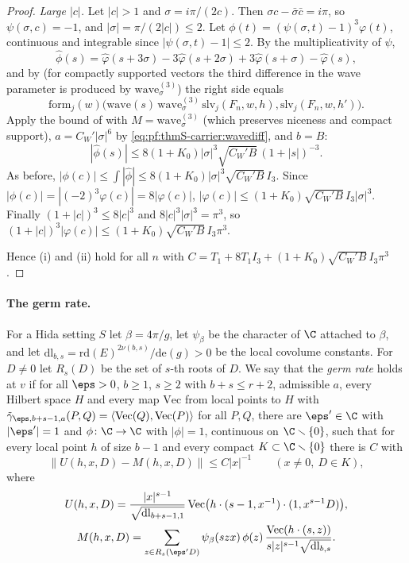 \begin{proof}
\emph{Large $|c|$.} Let $|c|>1$ and $\sigma=i\pi/(2c)$. Then $\sigma c-\bar\sigma\bar c=i\pi$, so $\psi(\sigma,c)=-1$, and
$|\sigma|=\pi/(2|c|)\le2$. Let $\phi(t)=(\psi(\sigma,t)-1)^3\varphi(t)$, continuous and integrable since $|\psi(\sigma,t)-1|\le2$.
By the multiplicativity of $\psi$,
\[
\hat\phi(s)=\hat\varphi(s+3\sigma)-3\hat\varphi(s+2\sigma)+3\hat\varphi(s+\sigma)-\hat\varphi(s),
\]
and by  (for compactly supported vectors the third difference in
the wave parameter is produced by $\mathrm{wave}^{(3)}_\sigma$) the right side equals
\[
\mathrm{form}_j(w)\bigl(\mathrm{wave}(s)\,\mathrm{wave}^{(3)}_\sigma\,\mathrm{slv}_j(F_n,w,h),\mathrm{slv}_j(F_n,w,h')\bigr).
\]
Apply the bound of  with $M=\mathrm{wave}^{(3)}_\sigma$ (which preserves niceness and
compact support), $a=C_W'|\sigma|^6$ by \eqref{eq:pf:thmS-carrier:wavediff}, and $b=B$:
\[
|\hat\phi(s)|\le8(1+K_0)|\sigma|^3\sqrt{C_W'B}\,(1+|s|)^{-3}.
\]
As before, $|\phi(c)|\le\int|\hat\phi|\le8(1+K_0)|\sigma|^3\sqrt{C_W'B}\,I_3$. Since $|\phi(c)|=|(-2)^3\varphi(c)|=8|\varphi(c)|$,
$|\varphi(c)|\le(1+K_0)\sqrt{C_W'B}\,I_3|\sigma|^3$. Finally $(1+|c|)^3\le8|c|^3$ and $8|c|^3|\sigma|^3=\pi^3$, so
$(1+|c|)^3|\varphi(c)|\le(1+K_0)\sqrt{C_W'B}\,I_3\pi^3$.

Hence (i) and (ii) hold for all $n$ with $C=T_1+8T_1I_3+(1+K_0)\sqrt{C_W'B}\,I_3\pi^3$.
\end{proof}

\paragraph{The germ rate.}
For a Hida setting $S$ let $\beta=4\pi/g$, let $\psi_\beta$ be the character of $\C$ attached to $\beta$, and let
$\mathrm{dl}_{b,s}=\mathrm{rd}(E)^{2\nu(b,s)}/\mathrm{de}(g)>0$ be the local covolume constants. For $D\ne0$ let $R_s(D)$ be the
set of $s$-th roots of $D$. We say that the \emph{germ rate} holds at $v$ if for all $\eps>0$, $b\ge1$, $s\ge2$ with
$b+s\le r+2$, admissible $a$, every Hilbert space $H$ and every map $\mathrm{Vec}$ from local points to $H$ with
$\tilde\gamma_{\eps,b+s-1,a}(P,Q)=\langle\mathrm{Vec}(Q),\mathrm{Vec}(P)\rangle$ for all $P,Q$, there are $\eps'\in\C$ with
$|\eps'|=1$ and $\phi\colon\C\to\C$ with $|\phi|=1$, continuous on $\C\smallsetminus\{0\}$, such that for every local point $h$
of size $b-1$ and every compact $K\subset\C\smallsetminus\{0\}$ there is $C$ with
\begin{equation}\label{eq:pf:thmS-carrier:germrate}
\bigl\|U(h,x,D)-M(h,x,D)\bigr\|\le C|x|^{-1}\qquad(x\ne0,\ D\in K),
\end{equation}
where
\begin{gather*}
U(h,x,D)=\frac{|x|^{s-1}}{\sqrt{\mathrm{dl}_{b+s-1,1}}}\,\mathrm{Vec}\bigl(h\cdot(s-1,x^{-1})\cdot(1,x^{s-1}D)\bigr),\\
M(h,x,D)=\sum_{z\in R_s(\eps'D)}\psi_\beta(szx)\,\phi(z)\,\frac{\mathrm{Vec}(h\cdot(s,z))}{s|z|^{s-1}\sqrt{\mathrm{dl}_{b,s}}} .
\end{gather*}

